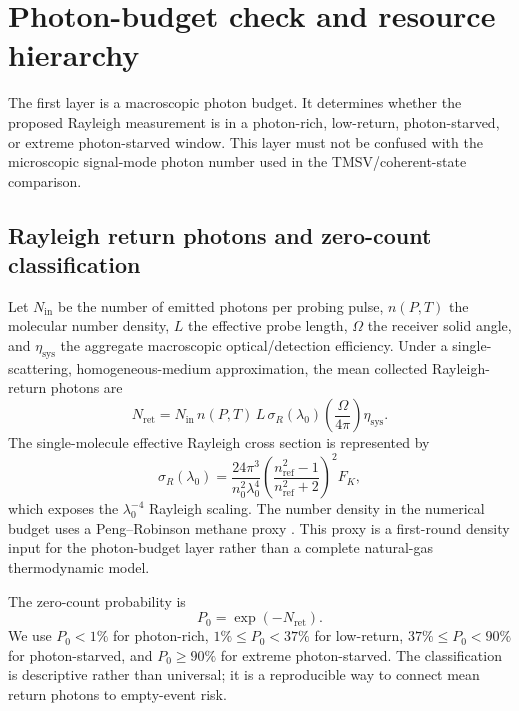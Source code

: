 \documentclass[a4paper,11pt]{article}
\numberwithin{equation}{section}
\newcommand{\Nret}{N_{\mathrm{ret}}}
\newcommand{\Nin}{N_{\mathrm{in}}}
\newcommand{\Pzero}{P_{0}}
\newcommand{\etasys}{\eta_{\mathrm{sys}}}
\begin{document}
\section{Photon-budget check and resource hierarchy}
\label{sec:budget}

The first layer is a macroscopic photon budget. It determines whether the proposed Rayleigh measurement is in a photon-rich, low-return, photon-starved, or extreme photon-starved window. This layer must not be confused with the microscopic signal-mode photon number used in the TMSV/coherent-state comparison.

\subsection{Rayleigh return photons and zero-count classification}

Let $\Nin$ be the number of emitted photons per probing pulse, $n(P,T)$ the molecular number density, $L$ the effective probe length, $\Omega$ the receiver solid angle, and $\etasys$ the aggregate macroscopic optical/detection efficiency. Under a single-scattering, homogeneous-medium approximation, the mean collected Rayleigh-return photons are
\begin{equation}
  \Nret = \Nin\, n(P,T)\, L\, \sigma_R(\lambda_0)\left(\frac{\Omega}{4\pi}\right)\etasys .
  \label{eq:rayleigh_budget}
\end{equation}
The single-molecule effective Rayleigh cross section is represented by
\begin{equation}
  \sigma_R(\lambda_0)=\frac{24\pi^3}{n_0^2\lambda_0^4}
  \left(\frac{n_{\mathrm{ref}}^2-1}{n_{\mathrm{ref}}^2+2}\right)^2 F_K,
  \label{eq:rayleigh_cross_section}
\end{equation}
which exposes the $\lambda_0^{-4}$ Rayleigh scaling. The number density in the numerical budget uses a Peng--Robinson methane proxy \cite{PengRobinson1976}. This proxy is a first-round density input for the photon-budget layer rather than a complete natural-gas thermodynamic model.

The zero-count probability is
\begin{equation}
  \Pzero=\exp(-\Nret).
\end{equation}
We use $\Pzero<1\%$ for photon-rich, $1\%\le\Pzero<37\%$ for low-return, $37\%\le\Pzero<90\%$ for photon-starved, and $\Pzero\ge90\%$ for extreme photon-starved. The classification is descriptive rather than universal; it is a reproducible way to connect mean return photons to empty-event risk.
\end{document}
